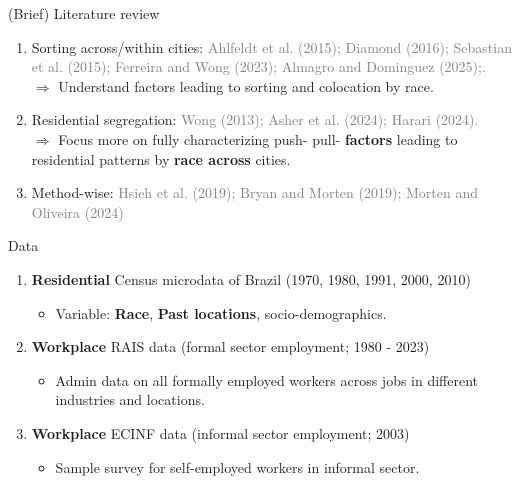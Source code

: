 \documentclass[aspectratio=169]{beamer}
\begin{document}
\begin{frame}{(Brief) Literature review}
\begin{enumerate}
	\item Sorting across/within cities: \textcolor{gray}{Ahlfeldt et al. (2015); Diamond (2016); Sebastian et al. (2015); Ferreira and Wong (2023); Almagro and Dominguez (2025);.}\\
		$\Rightarrow$ Understand factors leading to sorting and colocation by race.\vspace{1em}
	\item Residential segregation: \textcolor{gray}{Wong (2013); Asher et al. (2024); Harari (2024).}\\
		$\Rightarrow$ Focus more on fully characterizing push- pull- \textbf{factors} leading to residential patterns by \textbf{race across} cities.\vspace{1em}

	\item Method-wise: \textcolor{gray}{Hsieh et al. (2019); Bryan and Morten (2019); Morten and Oliveira (2024)}
\end{enumerate}	
\end{frame}

\begin{frame}{Data}
\begin{enumerate}
	\item \textbf{Residential} Census microdata of Brazil (1970, 1980, 1991, 2000, 2010)
		\begin{itemize}
			\item Variable: \textbf{Race}, \textbf{Past locations}, socio-demographics.
		\end{itemize}\vspace{1em}
	\item \textbf{Workplace} RAIS data (formal sector employment; 1980 - 2023)
		\begin{itemize}
			\item Admin data on all formally employed workers across jobs in different industries and locations. 
		\end{itemize}\vspace{1em}
	\item \textbf{Workplace} ECINF data (informal sector employment; 2003) 
		\begin{itemize}
			\item Sample survey for self-employed workers in informal sector.
		\end{itemize}
\end{enumerate}	
\end{frame}
\end{document}
